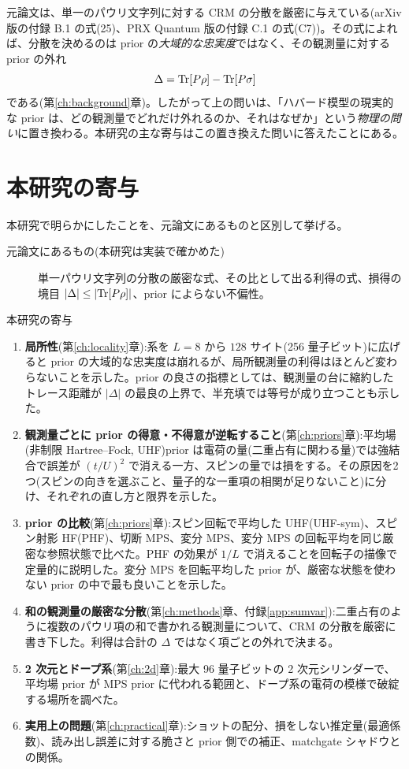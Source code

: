 元論文は、単一のパウリ文字列に対する CRM の分散を厳密に与えている(arXiv 版の付録 B.1 の式(25)、PRX Quantum 版の付録 C.1 の式(C7))。その式によれば、分散を決めるのは prior の\emph{大域的な忠実度}ではなく、その観測量に対する prior の外れ
\[
  \Delta=\operatorname{Tr}[P\rho]-\operatorname{Tr}[P\sigma]
\]
である(第\ref{ch:background}章)。したがって上の問いは、「ハバード模型の現実的な prior は、どの観測量でどれだけ外れるのか、それはなぜか」という\emph{物理の問い}に置き換わる。本研究の主な寄与はこの置き換えた問いに答えたことにある。

\section{本研究の寄与}

本研究で明らかにしたことを、元論文にあるものと区別して挙げる。

\begin{description}
  \item[元論文にあるもの(本研究は実装で確かめた)] 単一パウリ文字列の分散の厳密な式、その比として出る利得の式、損得の境目 $\lvert\Delta\rvert\le\lvert\operatorname{Tr}[P\rho]\rvert$、prior によらない不偏性。
  \item[本研究の寄与]
\end{description}
\begin{enumerate}
  \item \textbf{局所性}(第\ref{ch:locality}章):系を $L=8$ から $128$ サイト(256 量子ビット)に広げると prior の大域的な忠実度は崩れるが、局所観測量の利得はほとんど変わらないことを示した。prior の良さの指標としては、観測量の台に縮約したトレース距離が $\lvert\Delta\rvert$ の最良の上界で、半充填では等号が成り立つことも示した。
  \item \textbf{観測量ごとに prior の得意・不得意が逆転すること}(第\ref{ch:priors}章):平均場(非制限 Hartree--Fock, UHF)prior は電荷の量(二重占有に関わる量)では強結合で誤差が $(t/U)^2$ で消える一方、スピンの量では損をする。その原因を2つ(スピンの向きを選ぶこと、量子的な一重項の相関が足りないこと)に分け、それぞれの直し方と限界を示した。
  \item \textbf{prior の比較}(第\ref{ch:priors}章):スピン回転で平均した UHF(UHF-sym)、スピン射影 HF(PHF)、切断 MPS、変分 MPS、変分 MPS の回転平均を同じ厳密な参照状態で比べた。PHF の効果が $1/L$ で消えることを回転子の描像で定量的に説明した。変分 MPS を回転平均した prior が、厳密な状態を使わない prior の中で最も良いことを示した。
  \item \textbf{和の観測量の厳密な分散}(第\ref{ch:methods}章、付録\ref{app:sumvar}):二重占有のように複数のパウリ項の和で書かれる観測量について、CRM の分散を厳密に書き下した。利得は合計の $\Delta$ ではなく項ごとの外れで決まる。
  \item \textbf{2 次元とドープ系}(第\ref{ch:2d}章):最大 96 量子ビットの 2 次元シリンダーで、平均場 prior が MPS prior に代われる範囲と、ドープ系の電荷の模様で破綻する場所を調べた。
  \item \textbf{実用上の問題}(第\ref{ch:practical}章):ショットの配分、損をしない推定量(最適係数)、読み出し誤差に対する脆さと prior 側での補正、matchgate シャドウとの関係。
\end{enumerate}

